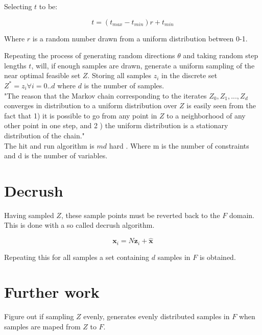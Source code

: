 \documentclass[11pt,a4paper,english]{article}
\begin{document}
Selecting $t$ to be:

\begin{equation}
	t = (t_{max}-t_{min})r+t_{min}
\end{equation}

Where $r$ is a random number drawn from a uniform distribution between 0-1. 

Repeating the process of generating random directions $\theta$ and taking random step lengths $t$, will, if enough samples are drawn, generate a uniform sampling of the near optimal feasible set $Z$. Storing all samples $z_i$ in the discrete set $Z^* = {z_i \forall i=0..d}$ where $d$ is the number of samples.\\


"The reason that the Markov chain corresponding to the iterates $Z_0,Z_1,...,Z_d$ converges in distribution to a uniform distribution over $Z$ is easily seen from the fact that 1) it is possible to go from any point in $Z$ to a neighborhood of any other point in one step, and 2 ) the uniform distribution is a stationary distribution of the chain." \cite{Smith1996}\\


The hit and run algorithm is $md$ hard \cite{Belisle1998}. Where m is the number of constraints and d is the number of variables. 

\section{Decrush}

Having sampled $Z$, these sample points must be reverted back to the $F$ domain. This is done with a so called decrush algorithm. 

\begin{equation}
	\mathbf{x}_i = N \mathbf{z}_i + \mathbf{\hat{x}}
\end{equation}

Repeating this for all samples a set containing $d$ samples in $F$ is obtained. 

\section{Further work}

Figure out if sampling $Z$ evenly, generates evenly distributed samples in $F$ when samples are maped from $Z$ to $F$. \\
\end{document}
